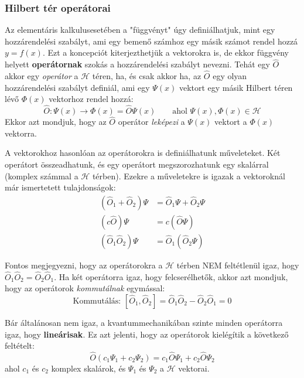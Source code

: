 \documentclass[../main.tex]{subfiles}
\begin{document}
\subsubsection{Hilbert tér operátorai}
Az elementáris kalkulusesetében a "függvényt" úgy definiálhatjuk, mint egy hozzárendelési szabályt, ami egy bemenő számhoz egy másik számot rendel hozzá $y = f(x)$. 
Ezt a koncepciót kiterjezthetjük a vektorokra is, de ekkor függvény helyett \textbf{operátornak} szokás a hozzárendelési szabályt nevezni. 
Tehát egy $\hat{O}$ akkor egy \textit{operátor} a $\mathcal{H}$ téren, ha, és csak akkor ha, az $\hat{O}$ egy olyan hozzárendelési szabályt definiál, ami egy $\Psi(x)$ vektort egy másik Hilbert téren lévő $\Phi(x)$ vektorhoz rendel hozzá:
\begin{equation}
    \hat{O} : \Psi(x) \rightarrow \Phi(x) = \hat{O} \Psi(x) \qquad \text{ahol } \Psi(x), \Phi(x) \in \mathcal{H}
\end{equation}
Ekkor azt mondjuk, hogy az $\hat{O}$ operátor \textit{leképezi} a $\Psi(x)$ vektort a $\Phi(x)$ vektorra.

A vektorokhoz hasonlóan az operátorokra is definiálhatunk műveleteket. Két operátort összeadhatunk, és egy operátort megszorozhatunk egy skalárral (komplex számmal a $\mathcal{H}$ térben). Ezekre a műveletekre is igazak a vektoroknál már ismertetett tulajdonságok:
\begin{equation}
    \begin{aligned}
        (\hat{O}_1 + \hat{O}_2) \Psi &= \hat{O}_1 \Psi + \hat{O}_2 \Psi \\
        (c \hat{O}) \Psi &= c (\hat{O} \Psi) \\
        (\hat{O}_1 \hat{O}_2) \Psi &= \hat{O}_1 (\hat{O}_2 \Psi)
    \end{aligned}
\end{equation}

Fontos megjegyezni, hogy az operátorokra a $\mathcal{H}$ térben NEM feltétlenül igaz, hogy $\hat{O}_1 \hat{O}_2 = \hat{O}_2 \hat{O}_1$. Ha két operátorra igaz, hogy felcserélhetők, akkor azt mondjuk, hogy az operátorok \textit{kommutálnak} egymással:
\begin{equation}
    \text{Kommutálás: }[\hat{O}_1, \hat{O}_2] = \hat{O}_1 \hat{O}_2 - \hat{O}_2 \hat{O}_1 = 0
\end{equation}

Bár általánosan nem igaz, a kvantummechanikában szinte minden operátorra igaz, hogy \textbf{lineárisak}. Ez azt jelenti, hogy az operátorok kielégítik a következő feltételt:
\begin{equation}
    \hat{O}(c_1 \Psi_1 + c_2 \Psi_2) = c_1 \hat{O} \Psi_1 + c_2 \hat{O} \Psi_2
\end{equation}
ahol $c_1$ és $c_2$ komplex skalárok, és $\Psi_1$ és $\Psi_2$ a $\mathcal{H}$ vektorai.
\end{document}
